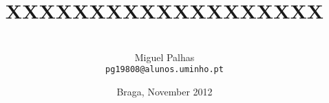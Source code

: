 \documentclass[abstract=on]{scrartcl}
\title{XXXXXXXXXXXXXXXXXXX}
\author{\\Miguel Palhas\\\texttt{\smaller pg19808@alunos.uminho.pt}}
\date{Braga, November 2012}
\begin{document}
  \maketitle

  
  
  
  
  

  
  \nocite*{}
  
  \newpage

  
\end{document}
